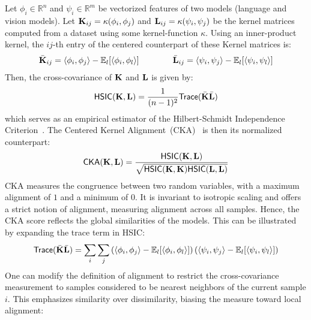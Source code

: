 Let $\phi_i \in \mathbb{R}^{n}$ and $\psi_i \in \mathbb{R}^{m}$ be vectorized features of two models (\eg language and vision models). Let $\mathbf{K}_{ij} = \kappa(\phi_i, \phi_j)$ and $\mathbf{L}_{ij} = \kappa(\psi_i, \psi_j)$ be the kernel matrices computed from a dataset using some kernel-function $\kappa$. Using an inner-product kernel, the $ij$-th entry of the centered counterpart of these Kernel matrices is:
\begin{align}
\bar{\mathbf{K}}_{ij} = \langle \phi_i, \phi_j \rangle - \mathbb{E}_l[\langle \phi_i, \phi_l \rangle] \qquad\qquad \bar{\mathbf{L}}_{ij} = \langle \psi_i, \psi_j \rangle - \mathbb{E}_l[\langle \psi_i, \psi_l \rangle]
\end{align}
Then, the cross-covariance of $\mathbf{K}$ and $\mathbf{L}$ is given by:
\begin{align}
\mathsf{HSIC}(\mathbf{K}, \mathbf{L}) = \frac{1}{(n-1)^2} \mathsf{Trace} (\bar{\mathbf{K}} \bar{\mathbf{L}})
\end{align}
which serves as an empirical estimator of the Hilbert-Schmidt Independence Criterion~\cite{gretton2005measuring}. The Centered Kernel Alignment~(CKA)~\cite{kornblith2019similarity} is then its normalized counterpart:
\begin{align}
\mathsf{CKA}(\mathbf{K}, \mathbf{L}) = \frac{\mathsf{HSIC}(\mathbf{K}, \mathbf{L})}{\sqrt{\mathsf{HSIC}(\mathbf{K}, \mathbf{K}) \mathsf{HSIC}(\mathbf{L}, \mathbf{L})}}
\end{align}
CKA measures the congruence between two random variables, with a maximum alignment of $1$ and a minimum of $0$. It is invariant to isotropic scaling and offers a strict notion of alignment, measuring alignment across all samples. Hence, the CKA score reflects the global similarities of the models. This can be illustrated by expanding the trace term in HSIC:
\begin{align}
\mathsf{Trace}(\bar{\mathbf{K}} \bar{\mathbf{L}}) = \sum_i \sum_j \left(\langle \phi_i, \phi_j \rangle - \mathbb{E}_l[\langle \phi_i, \phi_l \rangle]\right) \left(\langle \psi_i, \psi_j \rangle - \mathbb{E}_l[\langle \psi_i, \psi_l\rangle]\right)
\end{align}
One can modify the definition of alignment to restrict the cross-covariance measurement to samples considered to be nearest neighbors of the current sample $i$. This emphasizes similarity over dissimilarity, biasing the measure toward local alignment:
